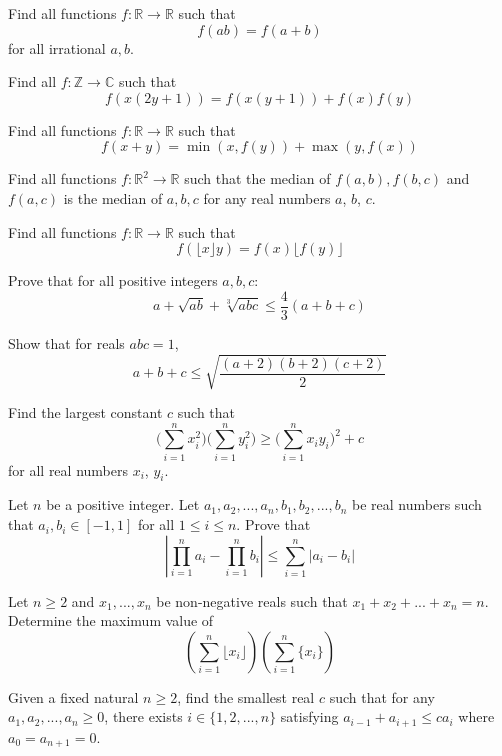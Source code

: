 


 {Find all functions $f: \mathbb{R} \rightarrow \mathbb{R}$ such that
    \[f(ab) = f(a+b)\]
for all irrational $a, b$.}

 {Find all $f:\mathbb{Z} \rightarrow\mathbb{C}$ such that $$f(x(2y+1))=f(x(y+1))+f(x)f(y)$$}



 {Find all functions $f: \mathbb{R}\rightarrow\mathbb{R}$ such that
\[f(x+y) = \min(x, f(y)) + \max(y, f(x))\]}

 {Find all functions $f: \mathbb{R}^2\rightarrow\mathbb{R}$ such that the median of $f(a,b), f(b,c)$ and $f(a,c)$ is the median of $a, b, c$ for any real numbers $a$, $b$, $c$.}

 {Find all functions $f: \mathbb{R}\rightarrow\mathbb{R}$ such that
\[f(\lfloor x \rfloor y) = f(x) \lfloor f(y) \rfloor\]}



 {Prove that for all positive integers $a, b, c$:
\[a + \sqrt{ab} + \sqrt[3]{abc} \le \frac43(a+b+c)\]}

 {Show that for reals $abc = 1$,
\[a + b + c \le \sqrt{\frac{(a+2)(b+2)(c+2)}{2}}\]}



 {Find the largest constant $c$ such that
\[\Big(\sum_{i=1}^nx_i^2\Big)\Big(\sum_{i=1}^ny_i^2\Big)\ge\Big(\sum_{i=1}^nx_iy_i\Big)^2+c\]
for all real numbers $x_i$, $y_i$.}

 {Let $n$ be a positive integer. Let $a_1, a_2, ..., a_n, b_1,b_2,...,b_n$ be real numbers such that $a_i,b_i\in [-1,1]$ for all $1\le i\le n$. Prove that $$\left\lvert \prod_{i=1}^n a_i - \prod_{i=1}^n b_i\right\rvert \le \sum_{i=1}^n |a_i-b_i|$$}

 {Let $n\ge 2$ and $x_1,...,x_n$ be non-negative reals such that $x_1+x_2+...+x_n = n$. Determine the maximum value of $$\left(\sum_{i=1}^n \lfloor x_i \rfloor \right) \left(\sum_{i=1}^n \{x_i\} \right)$$}

 {Given a fixed natural $n\ge 2$, find the smallest real $c$ such that for any $a_1,a_2,...,a_n\ge 0$, there exists $i\in\{1,2,...,n\}$ satisfying $a_{i-1}+a_{i+1}\le ca_i$ where $a_0=a_{n+1}=0$.}

